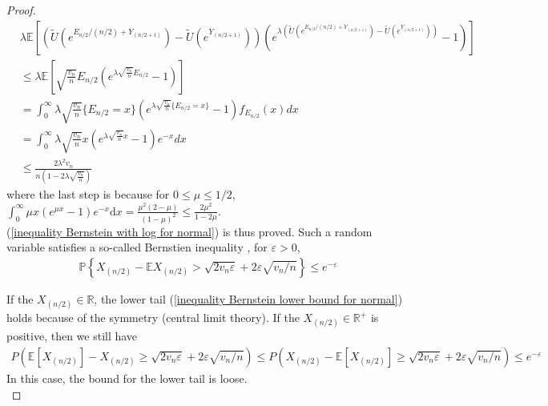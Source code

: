 \documentclass{article}
\theoremstyle{plain}
\begin{document}
\begin{proof}
\begin{align}
    & \lambda \mathbb{E}[\left(\tilde{U}\left(e^{E_{n / 2} /(n / 2)+Y_{(n / 2+1)}} \right)-\tilde{U}\left(e^{Y_{(n / 2+1)}}\right) \right) \left(e^{\lambda \left (\tilde{U}\left(e^{E_{n / 2} /(n / 2)+Y_{(n / 2+1)}} \right)-\tilde{U}\left(e^{Y_{(n / 2+1)}}\right) \right)} - 1\right)]\\
    & \leq \lambda \mathbb{E}[\sqrt{\frac{v_{n}}{n}} E_{n / 2} \left(e^{\lambda \sqrt{\frac{v_{n}}{n}} E_{n / 2}} -1\right)]\\
    & = \int_0^\infty \lambda  \sqrt{\frac{v_{n}}{n}} \{ E_{n / 2}  = x \} \left(e^{\lambda \sqrt{\frac{v_{n}}{n}} \{E_{n / 2} = x\}} -1\right) f_{E_{n/2}}(x) d x\\
    & = \int_0^\infty \lambda  \sqrt{\frac{v_{n}}{n}} x \left(e^{\lambda \sqrt{\frac{v_{n}}{n}} x } -1\right) e^{-x} d x\\
    & \leq \frac{2\lambda^2 v_n}{n (1 - 2 \lambda \sqrt{\frac{v_n}{n}})}
\end{align}
where the last step is because for $0 \leq \mu \leq 1/2$, $\int_{0}^{\infty} \mu x\left(e^{\mu x}-1\right) e^{-x} \mathrm{d} x=\frac{\mu^{2}(2-\mu)}{(1-\mu)^{2}} \leq \frac{2 \mu^{2}}{1-2 \mu}$.\\

(\ref{inequality Bernstein with log for normal}) is thus proved. Such a random variable satisfies a so-called Bernstien inequality \cite{boucheron2013}, for $\varepsilon > 0$, 
\begin{align}
    \mathbb{P}\left\{X_{(n / 2)}-\mathbb{E} X_{(n / 2)}>\sqrt{2 v_{n} \varepsilon}+2 \varepsilon \sqrt{v_{n} / n}\right\} \leq e^{-\varepsilon}
\end{align}

If the $X_{(n/2)} \in \mathbb{R}$, the lower tail (\ref{inequality Bernstein lower bound for normal}) holds because of the symmetry (central limit theory). If the $X_{(n/2)} \in \mathbb{R^+}$ is positive, then we still have 
\begin{align}
    P\left( \mathbb{E}[ X_{(n/2)}] - X_{(n/2)} \geq \sqrt{2v_n \varepsilon} + 2 \varepsilon \sqrt{v_n/n} \right) \leq P\left( X_{(n/2)}-\mathbb{E}[ X_{(n/2)}] \geq \sqrt{2v_n \varepsilon} + 2 \varepsilon \sqrt{v_n/n} \right) \leq e^{-\varepsilon}
\end{align}
In this case, the bound for the lower tail is loose.\\ 

\end{proof}
\end{document}
